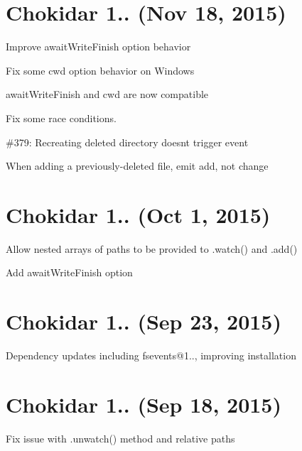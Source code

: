 \section*{Chokidar 1.. (Nov 18, 2015)}


\begin{DoxyItemize}
\item Improve {\ttfamily await\+Write\+Finish} option behavior
\item Fix some {\ttfamily cwd} option behavior on Windows
\item {\ttfamily await\+Write\+Finish} and {\ttfamily cwd} are now compatible
\item Fix some race conditions.
\item \#379\+: Recreating deleted directory doesn\textquotesingle{}t trigger event
\item When adding a previously-\/deleted file, emit \textquotesingle{}add\textquotesingle{}, not \textquotesingle{}change\textquotesingle{}
\end{DoxyItemize}

\section*{Chokidar 1.. (Oct 1, 2015)}


\begin{DoxyItemize}
\item Allow nested arrays of paths to be provided to {\ttfamily .watch()} and {\ttfamily .add()}
\item Add {\ttfamily await\+Write\+Finish} option
\end{DoxyItemize}

\section*{Chokidar 1.. (Sep 23, 2015)}


\begin{DoxyItemize}
\item Dependency updates including fsevents@1.., improving installation
\end{DoxyItemize}

\section*{Chokidar 1.. (Sep 18, 2015)}


\begin{DoxyItemize}
\item Fix issue with {\ttfamily .unwatch()} method and relative paths
\end{DoxyItemize}

